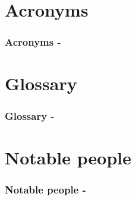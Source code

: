 %
%
%

\section*{Acronyms}

\begin{frame}[t,allowframebreaks]
  \frametitle{Acronyms -}
  \printglossary[type=\acronymtype]
\end{frame}



%
%
%

\section*{Glossary}

\begin{frame}[t,allowframebreaks]
  \frametitle{Glossary -}
  \printglossary[type=main]
\end{frame}

%
%
%

\section*{Notable people}

\begin{frame}[t,allowframebreaks]
  \frametitle{Notable people -}
  \printglossary[type=people]
\end{frame}
